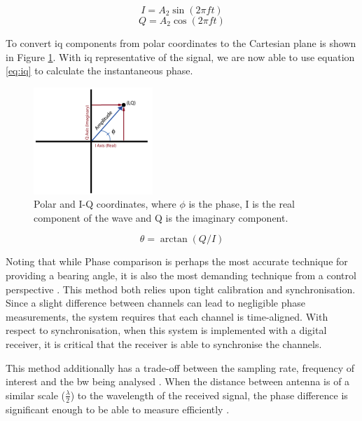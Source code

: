 \documentclass[class=report,11pt,crop=false]{standalone}
\begin{document}
\begin{equation}
    I = A_2 \sin(2 \pi f t) 
    \label{eq:I}
\end{equation}
\begin{equation}
    Q = A_2 \cos(2 \pi f t)
    \label{eq:Q}
\end{equation}

To convert \gls{iq} components from polar coordinates to the Cartesian plane is shown in Figure \ref{fig:IQ}. With \gls{iq} representative of the signal, we are now able to use equation \ref{eq:iq} to calculate the instantaneous phase.

\begin{figure}[h]
    \centering
    \captionsetup{type=figure}
    \includegraphics[width=0.4\textwidth]{Images/diagrams/iq.png}
    \caption{Polar and I-Q coordinates, where $\phi$ is the phase, I is the real component of the wave and Q is the imaginary component.}
    \label{fig:IQ}
\end{figure}

\begin{equation}
    \theta = \arctan(Q/I)
    \label{eq:iq}
\end{equation}


Noting that while Phase comparison is perhaps the most accurate technique for providing a bearing angle, it is also the most demanding technique from a control perspective \cite{phase-comparison-issues}. This method both relies upon tight calibration and synchronisation. Since a slight difference between channels can lead to negligible phase measurements, the system requires that each channel is time-aligned. With respect to synchronisation, when this system is implemented with a digital receiver, it is critical that the receiver is able to synchronise the channels. 

This method additionally has a trade-off between the sampling rate, frequency of interest and the \gls{bw} being analysed \cite{Phase-comparison}. When the distance between antenna is of a similar scale ($ \frac{\lambda}{2}$) to the wavelength of the received signal, the phase difference is significant enough to be able to measure efficiently \cite{phase-comparison-issues}.
\end{document}
